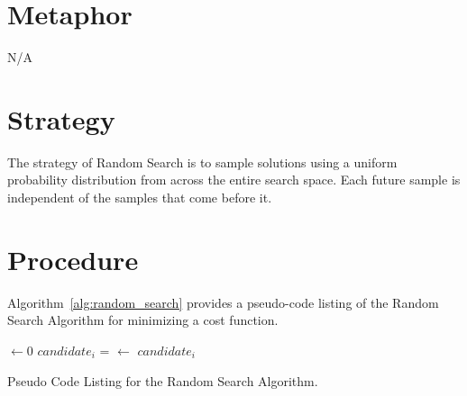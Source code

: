 \documentclass[a4paper, 11pt]{article}
\begin{document}
\section{Metaphor}
\label{sec:metaphor}
N/A

\section{Strategy}
\label{sec:strategy}
The strategy of Random Search is to sample solutions using a uniform probability distribution from across the entire search space. Each future sample is independent of the samples that come before it.

\section{Procedure}
\label{sec:procedure}
Algorithm~\ref{alg:random_search} provides a pseudo-code listing of the Random Search Algorithm for minimizing a cost function.

\begin{algorithm}[htp]
	\SetLine
	\KwIn{\NumIterations, \ProblemSize}
	\KwOut{\Best}
	\Best $\leftarrow 0$\;
	 {
		$candidate_i$ = \RandomSolution{\ProblemSize}\;
		 {
			\Best $\leftarrow$ $candidate_i$\;
		}
	}
	\Return{\Best}\;
	\caption{Pseudo Code Listing for the Random Search Algorithm.}
	\label{alg:random_search}
\end{algorithm}
\end{document}
